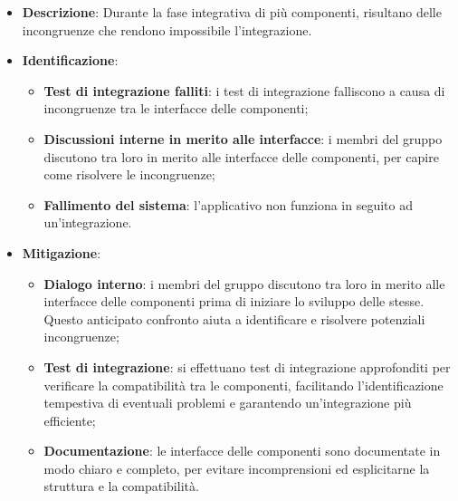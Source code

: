 \label{risk:interfacce incoerenti}
\begin{itemize}
	\item \textbf{Descrizione}:
	      Durante la fase integrativa di più componenti, risultano delle
	      incongruenze che rendono impossibile l'integrazione.
	\item \textbf{Identificazione}:
	      \begin{itemize}
		      \item \textbf{Test di integrazione falliti}: i test di
		            integrazione falliscono a causa di incongruenze tra le
		            interfacce delle componenti;

		      \item \textbf{Discussioni interne in merito alle interfacce}: i
		            membri del gruppo discutono tra loro in merito alle
		            interfacce delle componenti, per capire come risolvere le
		            incongruenze;

		      \item \textbf{Fallimento del sistema}: l'applicativo non funziona
		            in seguito ad un'integrazione.

	      \end{itemize}
	\item \textbf{Mitigazione}:
	      \begin{itemize}
		      \item \textbf{Dialogo interno}: i membri del gruppo discutono tra loro
		            in merito alle interfacce delle componenti prima di iniziare lo 
					sviluppo delle stesse. Questo anticipato confronto aiuta a identificare 
					e risolvere potenziali incongruenze;

		      \item \textbf{Test di integrazione}: si effettuano test di integrazione 
			  		approfonditi per verificare la compatibilità tra le componenti, facilitando 
			  		l'identificazione tempestiva di eventuali problemi e garantendo 
			  		un'integrazione più efficiente;

		      \item \textbf{Documentazione}: le interfacce delle componenti sono
		            documentate in modo chiaro e completo, per evitare
		            incomprensioni ed esplicitarne la struttura e la
		            compatibilità.
	      \end{itemize}
\end{itemize}
